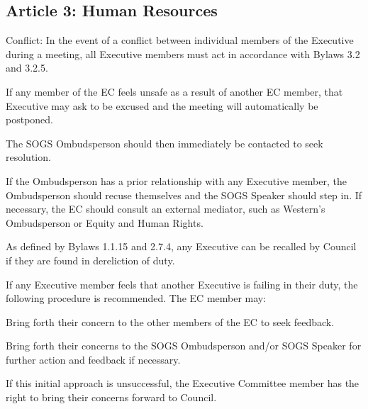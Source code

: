\subsection{Article 3: Human Resources}
\begin{longenum}[ label*=\thesubsection.\arabic*., align=left] 
\item Conflict: In the event of a conflict between individual members of the Executive during a meeting, all Executive members must act in accordance with Bylaws 3.2 and 3.2.5.
	\begin{longenum}[ label*=\arabic*., align=left]
	\item If any member of the EC feels unsafe as a result of another EC member, that Executive may ask to be excused and the meeting will automatically be postponed. 
	\item The SOGS Ombudsperson should then immediately be contacted to seek resolution.
		\begin{longenum}[ label*=\arabic*., align=left]
		\item If the Ombudsperson has a prior relationship with any Executive member, the Ombudsperson should recuse themselves and the SOGS Speaker should step in. If necessary, the EC should consult an external mediator, such as Western’s Ombudsperson or Equity and Human Rights.
		\end{longenum}
	\end{longenum}
\item As defined by Bylaws 1.1.15 and 2.7.4, any Executive can be recalled by Council if they are found in dereliction of duty.
	\begin{longenum}[ label*=\arabic*., align=left]
	\item If any Executive member feels that another Executive is failing in their duty, the following procedure is recommended. The EC member may:
		\begin{longenum}[ label*=\arabic*., align=left]
		\item Bring forth their concern to the other members of the EC to seek feedback.
		\item Bring forth their concerns to the SOGS Ombudsperson and/or SOGS Speaker for further action and feedback if necessary.
		\item If this initial approach is unsuccessful, the Executive Committee member has the right to bring their concerns forward to Council.
		\end{longenum}
	\end{longenum}
\end{longenum}